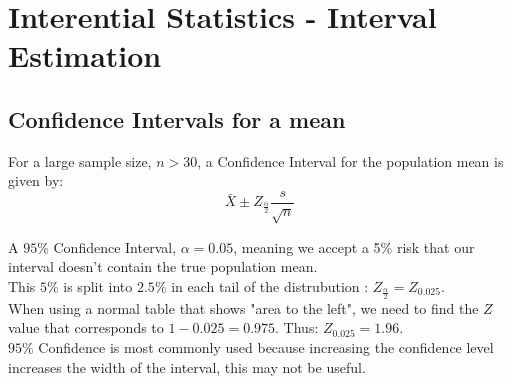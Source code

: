 \documentclass[a4paper, 10pt]{article}
\begin{document}
\pagebreak

\section{Interential Statistics - Interval Estimation}
\subsection{Confidence Intervals for a mean}

\begin{definitionbox}
    For a large sample size, $n > 30$, a Confidence Interval for the population mean is given by:
    $$\bar{X} \pm Z_{\frac{\alpha}{2}} \frac{s}{\sqrt{n}}$$
\end{definitionbox}
\noindent  A $95\%$ Confidence Interval, $\alpha = 0.05$, meaning we accept a 5\% risk that our interval doesn't contain the true population mean. \\
This $5\%$ is split into $2.5\%$ in each tail of the distrubution : $Z_{\frac{\alpha}{2}} = Z_{0.025}$. \\
When using a normal table that shows "area to the left", we need to find the $Z$ value that corresponds to $1 - 0.025 = 0.975$.
Thus: $Z_{0.025} = 1.96$. \\
$95 \%$ Confidence is most commonly used because increasing the confidence level increases the width of the interval, this may not be useful.
\end{document}
